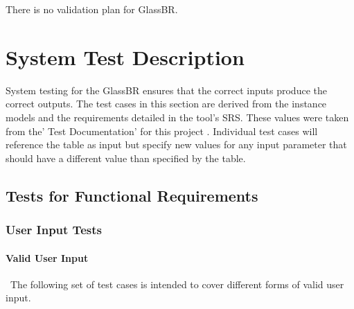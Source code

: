 \documentclass[12pt, titlepage]{article}
\newcommand{\progname}{GlassBR}
\begin{document}
There is no validation plan for \progname{}.

\section{System Test Description} \label{sec_System}

System testing for the \progname{} ensures that the correct inputs produce
the correct outputs. The test cases in this section are derived from the
instance models and the requirements detailed in the tool’s SRS. These values were 
taken from the' Test Documentation' for this project . Individual 
test cases will reference the table as input but specify new values for any 
input parameter that should have a different value than specified by the table.



	
\subsection{Tests for Functional Requirements}

\subsubsection{User Input Tests}
		
\paragraph{Valid User Input}

~\newline \noindent The following set of test cases is intended to cover 
different forms of valid user input. 
\end{document}

